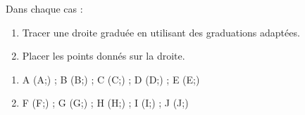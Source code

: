 \documentclass[exercice]{thedocument}%
\begin{document}
%
Dans chaque cas :
\begin{enumerate}
    \item Tracer une droite graduée en utilisant des graduations adaptées.
    \item Placer les points donnés sur la droite.
\end{enumerate}
\begin{enumerate}
        \item A (\<A;) ; B (\<B;) ; C (\<C;) ; D (\<D;) ; E (\<E;)
        \item F (\<F;) ; G (\<G;) ; H (\<H;) ; I (\<I;) ; J (\<J;)
\end{enumerate}
\end{document}
